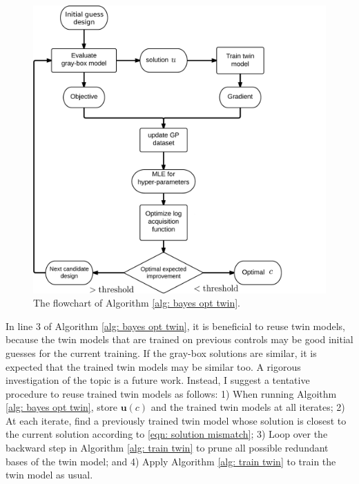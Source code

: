 \begin{figure}
    \begin{center}
        \includegraphics[width=12cm]{../opt_framework_2.png}
        \caption{The flowchart of Algorithm \ref{alg: bayes opt twin}.}
        \label{fig: opt flowchart}
    \end{center}
\end{figure}

In line 3 of Algorithm \ref{alg: bayes opt twin}, 
it is beneficial to reuse twin models, because the
twin models that are trained on previous controls may be good initial guesses for 
the current training. 
If the gray-box solutions are similar, it is expected that the trained twin models 
may be similar too.
A rigorous investigation of the topic is a future work. Instead, I suggest a tentative
procedure to reuse trained twin models as follows:
1) When running Algoithm \ref{alg: bayes opt twin}, store 
$\boldsymbol{u}(c)$ and the trained twin models
at all iterates; 2) At each iterate, find a previously trained twin model whose solution is closest 
to the current solution according to \eqref{eqn: solution mismatch};
3) Loop over the backward step in Algorithm 
\ref{alg: train twin} to prune all possible redundant bases of the twin model; and
4) Apply Algorithm \ref{alg: train twin} to train the twin model as usual.\\


